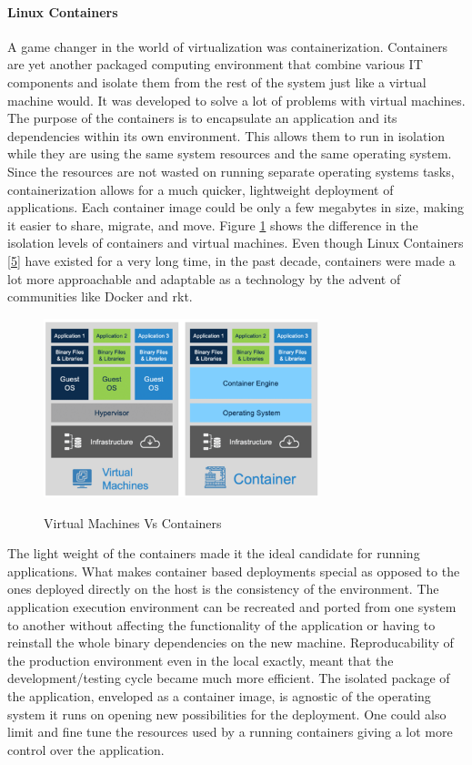 \documentclass[12pt,titlepage]{article}
\begin{document}
\paragraph{Linux Containers}
\label{sec:org1514fcb}
A game changer in the world of virtualization was containerization. Containers
are yet another packaged computing environment that combine various IT
components and isolate them from the rest of the system just like a virtual
machine would. It was developed to solve a lot of problems with virtual
machines. The purpose of the containers is to encapsulate an application and its
dependencies within its own environment. This allows them to run in isolation
while they are using the same system resources and the same operating system.
Since the resources are not wasted on running separate operating systems tasks,
containerization allows for a much quicker, lightweight deployment of
applications. Each container image could be only a few megabytes in size, making
it easier to share, migrate, and move. Figure \ref{fig:vm_vs_containers} shows the difference in the
isolation levels of containers and virtual machines.
Even though Linux Containers \hyperref[ref:5]{[5}]
have existed for a very long time, in the past decade, containers were made a
lot more approachable and adaptable as a
technology by the advent of communities like Docker and rkt.

\begin{figure}[!h]
    \caption{Virtual Machines Vs Containers}
    \centering
    \includegraphics[width=80mm]{./thesis_images/VM_image.PNG}
    \label{fig:vm_vs_containers}
\end{figure}

The light weight of the containers
made it the ideal candidate for running applications. What makes container based deployments special
as opposed to the ones deployed directly on the host is the consistency of the environment. The application
execution environment can be recreated and ported from one system to another without affecting the functionality
of the application or having to reinstall the whole binary dependencies on the new machine. Reproducability of the
production environment even in the local exactly, meant that the development/testing cycle became much more efficient.
The isolated package of the application, enveloped as a container image, is
agnostic of the operating system it runs on opening new possibilities for the
deployment. One could also limit and fine tune the resources used by a running
containers giving a lot more control over the application.
\end{document}
